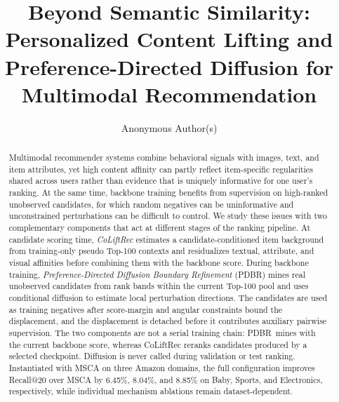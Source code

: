 \documentclass[sigconf,anonymous,review]{acmart}
\newcommand{\pdbr}{PDBR}
\begin{document}
\title{Beyond Semantic Similarity: Personalized Content Lifting and Preference-Directed Diffusion for Multimodal Recommendation}

\author{Anonymous Author(s)}

\begin{abstract}
Multimodal recommender systems combine behavioral signals with images, text, and item attributes, yet high content affinity can partly reflect item-specific regularities shared across users rather than evidence that is uniquely informative for one user's ranking.
At the same time, backbone training benefits from supervision on high-ranked unobserved candidates, for which random negatives can be uninformative and unconstrained perturbations can be difficult to control.
We study these issues with two complementary components that act at different stages of the ranking pipeline.
At candidate scoring time, \emph{CoLiftRec} estimates a candidate-conditioned item background from training-only pseudo Top-100 contexts and residualizes textual, attribute, and visual affinities before combining them with the backbone score.
During backbone training, \emph{Preference-Directed Diffusion Boundary Refinement} (\pdbr) mines real unobserved candidates from rank bands within the current Top-100 pool and uses conditional diffusion to estimate local perturbation directions. The candidates are used as training negatives after score-margin and angular constraints bound the displacement, and the displacement is detached before it contributes auxiliary pairwise supervision.
The two components are not a serial training chain: \pdbr\ mines with the current backbone score, whereas CoLiftRec reranks candidates produced by a selected checkpoint.
Diffusion is never called during validation or test ranking.
Instantiated with MSCA on three Amazon domains, the full configuration improves Recall@20 over MSCA by 6.45\%, 8.04\%, and 8.85\% on Baby, Sports, and Electronics, respectively, while individual mechanism ablations remain dataset-dependent.
\end{abstract}


\end{document}
